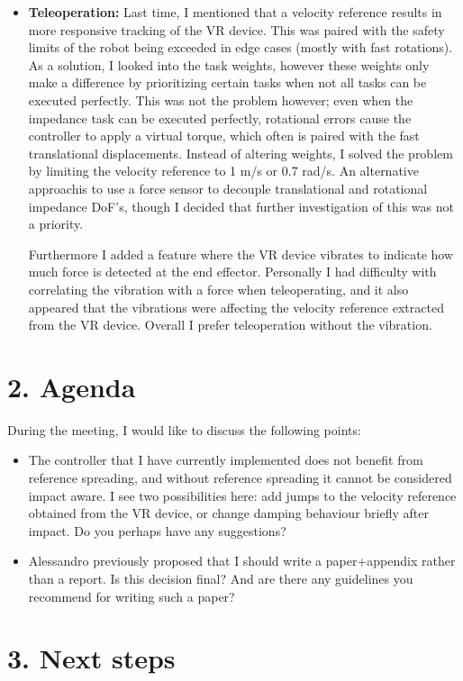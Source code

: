 \documentclass[11pt]{report}
\numberwithin{equation}{section}        %
\numberwithin{figure}{section}          %
\numberwithin{table}{section}           %
\begin{document}
\begin{itemize}
  \item \textbf{Teleoperation:} Last time, I mentioned that a velocity reference results in more responsive tracking of the VR device. This was paired with the safety limits of the robot being exceeded in edge cases (mostly with fast rotations). As a solution, I looked into the task weights, however these weights only make a difference by prioritizing certain tasks when not all tasks can be executed perfectly. This was not the problem however; even when the impedance task can be executed perfectly, rotational errors cause the controller to apply a virtual torque, which often is paired with the fast translational displacements. Instead of altering weights, I solved the problem by limiting the velocity reference to 1 m/s or 0.7 rad/s. An alternative approachis to use a force sensor to decouple translational and rotational impedance DoF's, though I decided that further investigation of this was not a priority.

  Furthermore I added a feature where the VR device vibrates to indicate how much force is detected at the end effector. Personally I had difficulty with correlating the vibration with a force when teleoperating, and it also appeared that the vibrations were affecting the velocity reference extracted from the VR device. Overall I prefer teleoperation without the vibration.
    
  \end{itemize}

  \section*{2. Agenda}
  During the meeting, I would like to discuss the following points:

  \begin{itemize}
      \item The controller that I have currently implemented does not benefit from reference spreading, and without reference spreading it cannot be considered impact aware. I see two possibilities here: add jumps to the velocity reference obtained from the VR device, or change damping behaviour briefly after impact. Do you perhaps have any suggestions?
      \item Alessandro previously proposed that I should write a paper+appendix rather than a report. Is this decision final? And are there any guidelines you recommend for writing such a paper?
  \end{itemize}

  \section*{3. Next steps}
\end{document}
